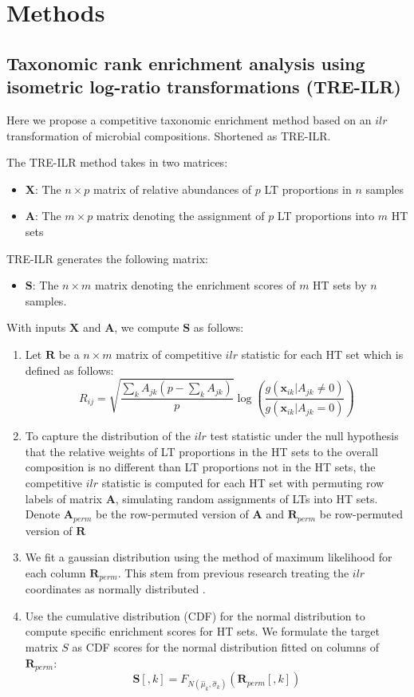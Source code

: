 \documentclass{article}
\begin{document}
\section{Methods}
\subsection{Taxonomic rank enrichment analysis using isometric log-ratio transformations (TRE-ILR)}
Here we propose a competitive taxonomic enrichment method based on an $ilr$ transformation of microbial compositions. Shortened as TRE-ILR.  
\vspace{3mm}

\noindent The TRE-ILR method takes in two matrices: 
\begin{itemize}
    \item $\bm X$: The $n \times p$ matrix of relative abundances of $p$ LT proportions in $n$ samples
    \item $\bm A$: The $m \times p$ matrix denoting the assignment of $p$ LT proportions into $m$ HT sets
\end{itemize}
TRE-ILR generates the following matrix: 
\begin{itemize}
    \item $\bm S$: The $n \times m$ matrix denoting the enrichment scores of $m$ HT sets by $n$ samples. 
\end{itemize}
With inputs $\bm{X}$ and $\bm{A}$, we compute $\bm{S}$ as follows:  
\begin{enumerate}
    \item Let $\bm{R}$ be a $n \times m$ matrix of competitive $ilr$ statistic for each HT set which is defined as follows:
    \begin{equation}
    R_{ij} = \sqrt{\frac{\sum_k A_{jk}(p - \sum_k A_{jk})}{p}} \log \left(\frac{g(\bm{x}_{ik} |A_{jk} \neq 0)}{g(\bm{x}_{ik} | A_{jk} = 0)}\right)
    \end{equation}
    \item To capture the distribution of the $ilr$ test statistic under the null hypothesis that the relative weights of LT proportions in the HT sets to the overall composition is no different than LT proportions not in the HT sets, the competitive $ilr$ statistic is computed for each HT set with permuting row labels of matrix $\bm{A}$, simulating random assignments of LTs into HT sets. Denote $\bm{A}_{perm}$ be the row-permuted version of $\bm{A}$ and $\bm{R}_{perm}$ be row-permuted version of $\bm{R}$
    \item We fit a gaussian distribution using the method of maximum likelihood for each column $\bm{R}_{perm}$. This stem from previous research treating the $ilr$ coordinates as normally distributed \cite{egozcue2005}.  
    \item Use the cumulative distribution (CDF) for the normal distribution to compute specific enrichment scores for HT sets. We formulate the target matrix $S$ as CDF scores for the normal distribution fitted on columns of $\bm{R}_{perm}$:
    \begin{equation}
        \bm{S}[,k] = F_{N(\hat{\mu}_{k},\hat{\sigma}_{k})}(\bm{R}_{perm}[,k])
    \end{equation}
\end{enumerate}
\end{document}
